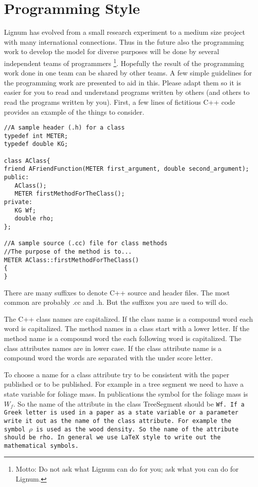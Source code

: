 \section{Programming Style}

Lignum has evolved from  a small research experiment  to a medium size
project with many international connections.   Thus in the future also
the programming work to develop the model for diverse purposes will be
done by several  independent teams of programmers \footnote{Motto:  Do
not ask what Lignum can do for you; ask  what you can do for Lignum.}.
Hopefully the result of  the programming work done  in one team can be
shared by  other teams.  A  few simple  guidelines for the programming
work are presented to aid in this.  Please adapt  them so it is easier
for you to read and understand programs  written by others (and others
to  read the  programs  written  by  you).  First,   a   few lines  of
fictitious C++ code provides an example of the things to consider.

\begin{verbatim}
//A sample header (.h) for a class
typedef int METER;
typedef double KG;

class AClass{
friend AFriendFunction(METER first_argument, double second_argument);
public:
   AClass();
   METER firstMethodForTheClass();
private:
   KG Wf;
   double rho;
};

//A sample source (.cc) file for class methods
//The purpose of the method is to...
METER AClass::firstMethodForTheClass()
{
}
\end{verbatim}

There are many  suffixes to  denote C++  source and  header files. The
most common are probably .cc and .h. But the suffixes  you are used to
will do.

The C++ class names are capitalized.  If  the class name is a compound
word each word is capitalized. The method names  in a class start with
a  lower letter.  If the method   name is a    compound word the  each
following word is capitalized. The class attributes names are in lower
case. If the class  attribute name is a  compound  word the words  are
separated with the under score letter.

To choose a name for  a class attribute try  to be consistent with the
paper published or to be published.  For example  in a tree segment we
need to  have a state variable  for foliage mass.  In publications the
symbol for the foliage mass is $W_f$.  So the name of the attribute in
the class TreeSegment should be \tt Wf\rm.  If a  Greek letter is used
in a paper as a state variable or a parameter write it out as the name
of the class attribute.  For example the symbol  $\rho$ is used as the
wood density.  So the name of the attribute  should be \tt rho\rm.  In
general we use \LaTeX \ style to write out the mathematical symbols.

